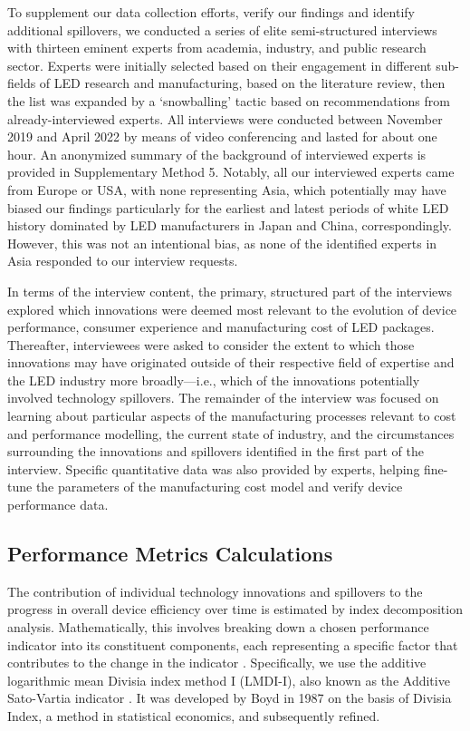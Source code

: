 \documentclass[parskip=full]{article}
\begin{document}
To supplement our data collection efforts, verify our findings and identify additional spillovers, we conducted a series of elite semi-structured interviews \cite{tansey2009process} with thirteen eminent experts from academia, industry, and public research sector. Experts were initially selected based on their engagement in different sub-fields of LED research and manufacturing, based on the literature review, then the list was expanded by a ‘snowballing’ tactic based on recommendations from already-interviewed experts. All interviews were conducted between November 2019 and April 2022 by means of video conferencing and lasted for about one hour. An anonymized summary of the background of interviewed experts is provided in Supplementary Method 5. Notably, all our interviewed experts came from Europe or USA, with none representing Asia, which potentially may have biased our findings particularly for the earliest and latest periods of white LED history dominated by LED manufacturers in Japan and China, correspondingly. However, this was not an intentional bias, as none of the identified experts in Asia responded to our interview requests. 

In terms of the interview content, the primary, structured part of the interviews explored which innovations were deemed most relevant to the evolution of device performance, consumer experience and manufacturing cost of LED packages. Thereafter, interviewees were asked to consider the extent to which those innovations may have originated outside of their respective field of expertise and the LED industry more broadly—i.e., which of the innovations potentially involved technology spillovers. The remainder of the interview was focused on learning about particular aspects of the manufacturing processes relevant to cost and performance modelling, the current state of industry, and the circumstances surrounding the innovations and spillovers identified in the first part of the interview. Specific quantitative data was also provided by experts, helping fine-tune the parameters of the manufacturing cost model and verify device performance data.

\subsection{Performance Metrics Calculations}
\label{subsec:performance_metrics}

The contribution of individual technology innovations and spillovers to the progress in overall device efficiency over time is estimated by index decomposition analysis. Mathematically, this involves breaking down a chosen performance indicator into its constituent components, each representing a specific factor that contributes to the change in the indicator \cite{Ang1997}. Specifically, we use the additive logarithmic mean Divisia index method I (LMDI-I), also known as the Additive Sato-Vartia indicator \cite{deBoer2019}. It was developed by Boyd in 1987 \cite{Boyd1987} on the basis of Divisia Index, a method in statistical economics, and subsequently refined.
\end{document}
